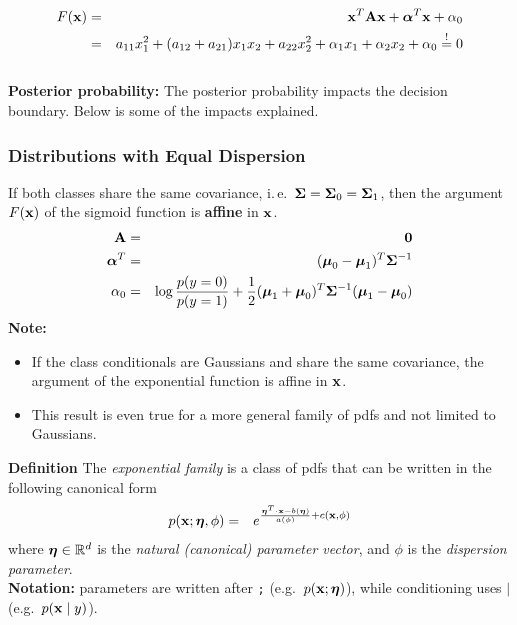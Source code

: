   \begin{eqnarray*}
    F(\bm{\mathrm{x}}) 
      &=& \bm{\mathrm{x}}^T \mathbf{A} \bm{\mathrm{x}} + \bm{\mathrm{\alpha}}^T\bm{\mathrm{x}} + \alpha_0 \\
      &=& a_{11}x_1^2 + (a_{12}+a_{21})x_1x_2 + a_{22}x_2^2 + \alpha_1 x_1 + \alpha_2 x_2 + \alpha_0 \stackrel{!}{=} 0
  \end{eqnarray*}\\
  \textbf{Posterior probability: } 
  The posterior probability impacts the decision boundary. Below is some of the impacts explained. \\
  
  \subsubsection{Distributions with Equal Dispersion}
    If both classes share the same covariance, i.\,e.\ $\mathbf{\Sigma}= \mathbf{\Sigma}_0=\mathbf{\Sigma}_1$, then the argument $F(\bm{\mathrm{x}})$ of the sigmoid function is \textbf{affine} in $\bm{\mathrm{x}}$.
    \begin{eqnarray*}
      \mathbf{A}        &=& \mathbf{0} \\
      \bm{\mathrm{\alpha}}^T &=& (\bm{\mathrm{\mu}}_0 - \bm{\mathrm{\mu}}_1)^T \mathbf{\Sigma}^{-1} \\
      \alpha_0       &=& \log \frac{p(y=0)}{p(y=1)} +
                         \frac{1}{2}(\bm{\mathrm{\mu}}_1 + \bm{\mathrm{\mu}}_0)^T \mathbf{\Sigma}^{-1} (\bm{\mathrm{\mu}}_1 - \bm{\mathrm{\mu}}_0)
     \end{eqnarray*}
\textbf{Note:}
  \begin{itemize}
    \item If the class conditionals are Gaussians and share the same covariance, the argument of the exponential function is affine in $\bm{\mathrm{x}}$.
    \item This result is even true for a more general family of pdfs and not limited to Gaussians.
  \end{itemize}
 \textbf{Definition}
The {\em exponential family} is a class of pdfs that can be written in the following canonical form
    \begin{eqnarray*}
      p(\bm{\mathrm{x}};\bm{\mathrm{\eta}}, \phi) &=& e^{\frac{\bm{\mathrm{\eta}}^T \cdot \bm{\mathrm{x}} -b(\bm{\mathrm{\eta}})}{a(\phi)}+c(\bm{\mathrm{x}},\phi)}
    \end{eqnarray*}
    where $\bm{\mathrm{\eta}}\in \mathbb{R}^d$ is the \emph{natural (canonical) parameter vector}, and $\phi$ is the {\em dispersion parameter}. \\
    \textbf{Notation:} parameters are written after \texttt{;} (e.g.\ $p(\bm{\mathrm{x}};\bm{\mathrm{\eta}})$), while conditioning uses $\mid$ (e.g.\ $p(\bm{\mathrm{x}}\mid y)$).
  
